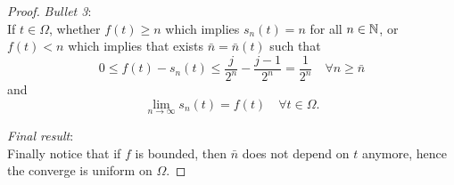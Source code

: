\begin{proof}
	\textit{Bullet 3}:\\
	If $t \in \Omega$, whether $f(t) \geq n$ which implies $s_n(t)  = n$ for all $n \in \mathbb N$, or $f(t) < n$ which implies that exists $\bar n = \bar n (t)$ such that 
	$$ 
		0
		\leq f(t) - s_n (t)
		\leq \frac{j}{2^n} - \frac{j-1}{2^n}
		= \frac{1}{2^n}
		\quad \forall n \geq \bar n
	$$
	and
	$$
		\lim\limits_{n \to \infty} s_n(t) 
		= f(t) 
		\quad \forall t \in \Omega.
	$$ 
	
	\textit{Final result}:\\
	Finally notice that if $f$ is bounded, then $\bar n$ does not depend on $t$ anymore, hence the converge is uniform on $\Omega$.
\end{proof}
